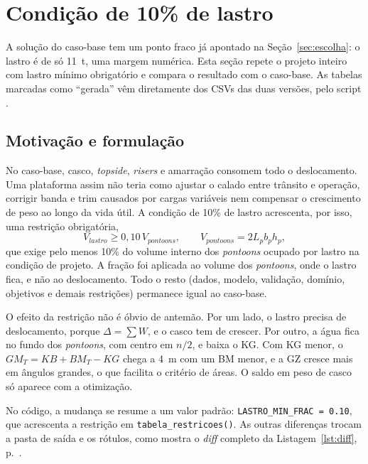 \documentclass[11pt,a4paper]{article}
\newcommand{\lst}[1]{Listagem~\ref{lst:#1}, p.~\pageref{lst:#1}}
\begin{document}
\section{Condição de 10\% de lastro}\label{sec:lastro}

A solução do caso-base tem um ponto fraco já apontado na Seção~\ref{sec:escolha}: o lastro é de só
11~t, uma margem numérica. Esta seção repete o projeto inteiro com lastro mínimo obrigatório e
compara o resultado com o caso-base. As tabelas marcadas como ``gerada'' vêm diretamente dos CSVs
das duas versões, pelo script .

\subsection{Motivação e formulação}

No caso-base, casco, \emph{topside}, \emph{risers} e amarração consomem todo o deslocamento. Uma
plataforma assim não teria como ajustar o calado entre trânsito e operação, corrigir banda e trim
causados por cargas variáveis nem compensar o crescimento de peso ao longo da vida útil. A
condição de 10\% de lastro acrescenta, por isso, uma restrição obrigatória,
\begin{equation}
V_{lastro} \ge 0{,}10\,V_{pontoons}, \qquad V_{pontoons} = 2 L_p b_p h_p ,
\end{equation}
que exige pelo menos 10\% do volume interno dos \emph{pontoons} ocupado por lastro na condição de
projeto. A fração foi aplicada ao volume dos \emph{pontoons}, onde o lastro fica, e não ao
deslocamento. Todo o resto (dados, modelo, validação, domínio, objetivos e demais restrições)
permanece igual ao caso-base.

O efeito da restrição não é óbvio de antemão. Por um lado, o lastro precisa de deslocamento, porque
$\Delta = \sum W$, e o casco tem de crescer. Por outro, a água fica no fundo dos \emph{pontoons},
com centro em $n/2$, e baixa o KG. Com KG menor, o $GM_T = KB + BM_T - KG$ chega a 4~m com um BM
menor, e a GZ cresce mais em ângulos grandes, o que facilita o critério de áreas. O saldo em peso de
casco só aparece com a otimização.

No código, a mudança se resume a um valor padrão: \texttt{LASTRO\_MIN\_FRAC = 0.10}, que acrescenta
a restrição em \texttt{tabela\_restricoes()}. As outras diferenças trocam a pasta de saída e os
rótulos, como mostra o \emph{diff} completo da \lst{diff}.
\end{document}
